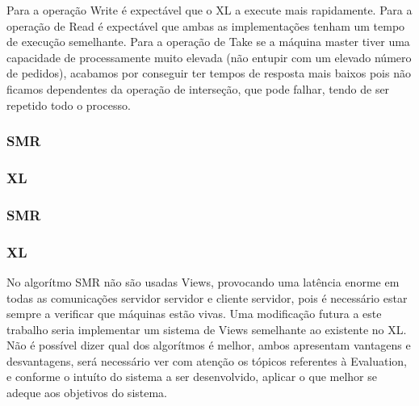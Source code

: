 \documentclass[times, 10pt,twocolumn]{article}
\begin{document}

Para a operação Write é expectável que o XL a execute mais rapidamente.
Para a operação de Read é expectável que ambas as implementações tenham um tempo de execução semelhante.
Para a operação de Take se a máquina master tiver uma capacidade de processamente muito elevada (não entupir com
um elevado número de pedidos), acabamos por conseguir ter tempos de resposta mais baixos pois não ficamos dependentes
da operação de interseção, que pode falhar, tendo de ser repetido todo o processo.

\subsubsection{SMR}
\subsubsection{XL}
\subsubsection{SMR}
\subsubsection{XL}
No algorítmo SMR não são usadas Views, provocando uma latência enorme em todas as comunicações servidor servidor
e cliente servidor, pois é necessário estar sempre a verificar que máquinas estão vivas. Uma modificação futura a este
trabalho seria implementar um sistema de Views semelhante ao existente no XL.
Não é possível dizer qual dos algorítmos é melhor, ambos apresentam vantagens e desvantagens, será necessário ver com atenção
os tópicos referentes à Evaluation, e conforme o intuíto do sistema a ser desenvolvido, aplicar o que melhor se adeque aos objetivos
do sistema.


\nocite{ex1,ex2}


\end{document}
